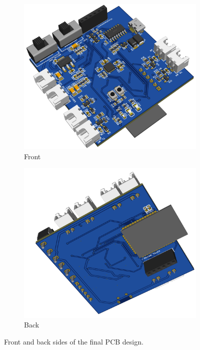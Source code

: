 \begin{figure}[H]
    \centering
    \captionsetup{justification=centering, margin=1cm}
    \begin{subfigure}[b]{0.48\textwidth}
        \centering
        \includegraphics[width=\textwidth]{img/final-pcb2.png}
        \caption{Front}
        \label{fig:pcb-front}
    \end{subfigure}
    \hfill
    \begin{subfigure}[b]{0.48\textwidth}
        \centering
        \includegraphics[width=\textwidth]{img/final-pcb-back.png}
        \caption{Back}
        \label{fig:pcb-back}
    \end{subfigure}
    \caption{Front and back sides of the final PCB design.}
    \label{fig:pcb-final}
\end{figure}

